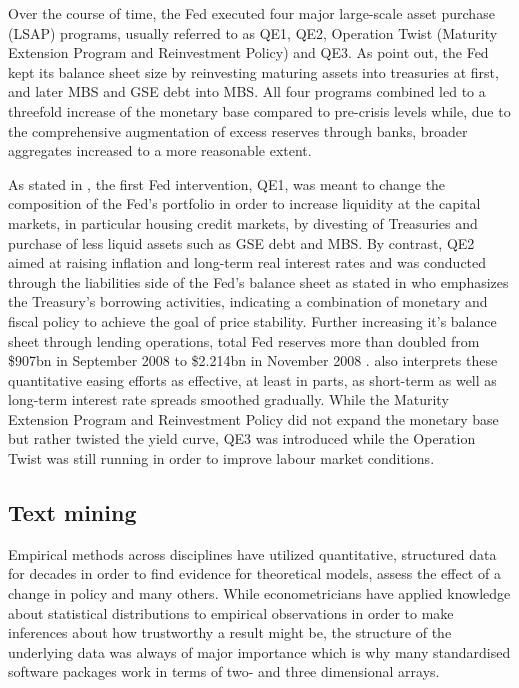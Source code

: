 Over the course of time, the Fed executed four major large-scale asset purchase (LSAP) programs, usually referred to as QE1, QE2, Operation Twist (Maturity Extension Program and
Reinvestment Policy) and QE3. As \textcite{Fawley.2013} point out, the Fed kept its balance sheet size by reinvesting maturing assets into treasuries at first, and later MBS and GSE debt into MBS. All four programs combined led to a threefold increase of the monetary base compared to pre-crisis levels while, due to the comprehensive augmentation of excess reserves through banks, broader aggregates increased to a more reasonable extent. 

As stated in \textcite{Blinder.2010}, the first Fed intervention, QE1, was meant to change the composition of the Fed's portfolio in order to increase liquidity at the capital markets, in particular housing credit markets, by divesting of Treasuries and purchase of less liquid assets such as GSE debt and MBS. %
By contrast, QE2 aimed at raising inflation and long-term real interest rates and was conducted through the liabilities side of the Fed's balance sheet as stated in \textcite{Blinder.2010} who emphasizes the Treasury's borrowing activities, indicating a combination of monetary and fiscal policy to achieve the goal of price stability. Further increasing it's balance sheet through lending operations, total Fed reserves more than doubled from \$907bn in September 2008 to \$2.214bn in November 2008 \parencite[p.~468]{Blinder.2010}. \textcite{Blinder.2010} also interprets these quantitative easing efforts as effective, at least in parts, as short-term as well as long-term interest rate spreads smoothed gradually.
While the Maturity Extension Program and Reinvestment Policy did not expand the monetary base but rather twisted the yield curve, QE3 was introduced while the Operation Twist was still running in order to improve labour market conditions.

%
\subsection{Text mining}

Empirical methods across disciplines have utilized quantitative, structured data for decades in order to find evidence for theoretical models, assess the effect of a change in policy and many others. While econometricians have applied knowledge about statistical distributions to empirical observations in order to make inferences about how trustworthy a result might be, the structure of the underlying data was always of major importance which is why many standardised software packages work in terms of two- and three dimensional arrays. 

